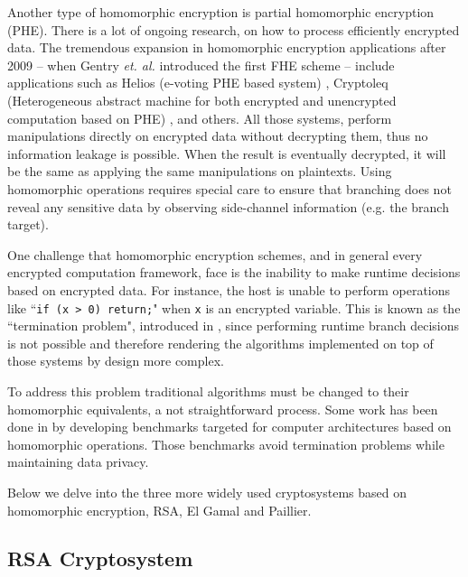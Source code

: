 Another type of homomorphic encryption is partial homomorphic encryption (PHE).
There is a lot of ongoing research, on how to process efficiently encrypted data.
The tremendous expansion in homomorphic encryption applications after 2009 -- when Gentry \textit{et. al.} introduced the first FHE scheme -- include applications such as Helios (e-voting PHE based system) \cite{adida2008helios}, Cryptoleq (Heterogeneous abstract machine for both encrypted and unencrypted computation based on PHE) \cite{mazonka2016cryptoleq}, and others.
All those systems, perform manipulations directly on encrypted data without decrypting them, thus no information leakage is possible.
When the result is eventually decrypted, it will be the same as applying the same manipulations on plaintexts.
Using homomorphic operations requires special care to ensure that branching does not reveal any sensitive data by observing side-channel information (e.g. the branch target).


One challenge that homomorphic encryption schemes, and in general every encrypted computation framework, face is the inability to make runtime decisions based on encrypted data.
For instance, the host is unable to perform operations like ``\texttt{if (x > 0) return;}" when \texttt{x} is an encrypted variable.
This is known as the ``termination problem", introduced in \cite{brenner2011secret}, since performing runtime branch decisions is not possible and therefore rendering the algorithms implemented on top of those systems by design more complex.


To address this problem traditional algorithms must be changed to their homomorphic equivalents, a not straightforward process.
Some work has been done in \cite{mouris2018terminator} by developing benchmarks targeted for computer architectures based on homomorphic operations.
Those benchmarks avoid termination problems while maintaining data privacy.


Below we delve into the three more widely used cryptosystems based on homomorphic encryption, RSA, El Gamal and Paillier.



\subsection{RSA Cryptosystem}\label{ss:rsa}


